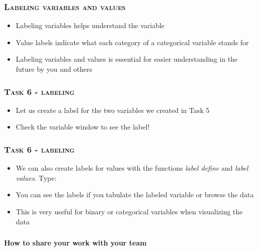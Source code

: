 \documentclass[10pt]{beamer}
\begin{document}
	\begin{frame}
		\frametitle{\textsc{Labeling variables and values}}
		\begin{itemize}	
			\item Labeling variables helps understand the variable 
			\item Value labels indicate what each category of a categorical variable stands for
			\item Labeling variables and values is essential for easier understanding in the future by you and others
		\end{itemize}
	\end{frame}
		
	\begin{frame}
		\frametitle{\textsc{Task 6 - labeling}}
		\begin{itemize}
			\item Let us create a label for the two variables we created in Task 5
		\end{itemize}
\begin{stlog}\end{stlog}
	
		\begin{itemize}
			\item Check the variable window to see the label!
		\end{itemize}		
	\end{frame}	
	

	\begin{frame}
		\frametitle{\textsc{Task 6 - labeling}}
		\begin{itemize}
		 	\item We can also create labels for values with the functions \textit{label define} and \textit{label values}. Type:
		\end{itemize}
\begin{stlog}\end{stlog}
	
		\begin{itemize}
	 		\item You can see the labels if you tabulate the labeled variable or browse the data
			\item This is very useful for binary or categorical variables when visualizing the data
		\end{itemize}		
	\end{frame}		
	
	
	\begin{frame}
		\frametitle{\textsc{}}

		\begin{center}
			\Large  \textbf{How to share your work with your team}
		\end{center}
	\end{frame}
\end{document}
